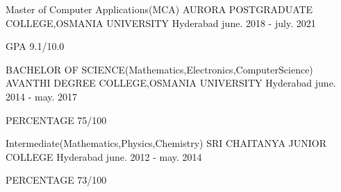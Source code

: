 

\begin{cventries}

  \cventry
    {Master of Computer Applications(MCA)} %
    {AURORA POSTGRADUATE COLLEGE,OSMANIA UNIVERSITY} %
    {Hyderabad} %
    {june. 2018 - july. 2021} %
    {
      \begin{cvitems} %
        \item {GPA 9.1/10.0}
      \end{cvitems}
    }
    \cventry
    {BACHELOR OF SCIENCE(Mathematics,Electronics,ComputerScience)} %
    {AVANTHI DEGREE COLLEGE,OSMANIA UNIVERSITY} %
    {Hyderabad} %
    {june. 2014 - may. 2017} %
    {
      \begin{cvitems} %
        \item {PERCENTAGE 75/100}
      \end{cvitems}
        }
  \cventry
    {Intermediate(Mathematics,Physics,Chemistry)} %
    {SRI CHAITANYA JUNIOR COLLEGE} %
    {Hyderabad} %
    {june. 2012 - may. 2014} %
    {
      \begin{cvitems} %
        \item {PERCENTAGE 73/100}
      \end{cvitems}
      }
\end{cventries}
